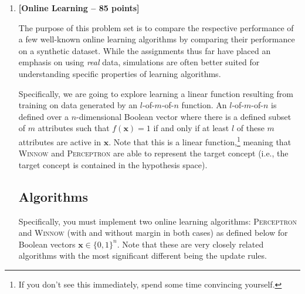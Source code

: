 \documentclass[12pt,letterpaper]{article}
\begin{document}
\begin{enumerate}
Please rewrite the linear program given by Equations (1-3) in terms of $\mathbf{c}$, $\mathbf{x}$, $\mathbf{A}$, and $\mathbf{b}$.  Note that given this formulation, you can use Matlab, Xpress, CVXOPT, GLPK, or many other LP solvers (including open-source) to solve this linear discriminant formulation.\footnote{Not that I am asking you to do this -- although it is useful to do at some point in your life...}

\item
{\bf [Online Learning -- 85 points]}

The purpose of this problem set is to compare the respective performance of a few well-known online learning algorithms by comparing their performance on a synthetic dataset. While the assignments thus far have placed an emphasis on using {\em real} data, simulations are often better suited for understanding specific properties of learning algorithms.

Specifically, we are going to explore learning a linear function resulting from training on data generated by an $l$-of-$m$-of-$n$ function.  An $l$-of-$m$-of-$n$ is defined over a $n$-dimensional Boolean vector where there is a defined subset of $m$ attributes such that $f(\mathbf{x}) = 1$ if and only if at least $l$ of these $m$ attributes are active in $\mathbf{x}$.  Note that this is a linear function,\footnote{If you don't see this immediately, spend some time convincing yourself.} meaning that \textsc{Winnow} and \textsc{Perceptron} are able to represent the target concept (i.e., the target concept is contained in the hypothesis space).

\subsection*{Algorithms}

Specifically, you must implement two online learning algorithms: \textsc{Perceptron} and \textsc{Winnow} (with and without margin in both cases) as defined below for Boolean vectors $\mathbf{x} \in \{0,1\}^n$.  Note that these are very closely related algorithms with the most significant different being the update rules.


\end{enumerate}
\end{document}

